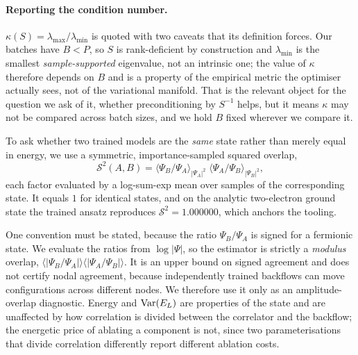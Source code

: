 \paragraph{Reporting the condition number.}
$\kappa(S)=\lambda_{\max}/\lambda_{\min}$ is quoted with two caveats that its definition
forces. Our batches have $B<P$, so $S$ is rank-deficient by construction and $\lambda_{\min}$
is the smallest \emph{sample-supported} eigenvalue, not an intrinsic one; the value of
$\kappa$ therefore depends on $B$ and is a property of the empirical metric the optimiser
actually sees, not of the variational manifold. That is the relevant object for the question we ask of it, whether preconditioning by $S^{-1}$ helps, but it means $\kappa$ may not be
compared across batch sizes, and we hold $B$ fixed wherever we compare it.

To ask whether two trained models are the \emph{same} state rather than merely equal in
energy, we use a symmetric, importance-sampled squared overlap,
\[
  \mathcal{S}^2(A,B)
  = \big\langle \Psi_B/\Psi_A\big\rangle_{|\Psi_A|^2}\;
    \big\langle \Psi_A/\Psi_B\big\rangle_{|\Psi_B|^2},
\]
each factor evaluated by a log-sum-exp mean over samples of the corresponding state.
It equals $1$ for identical states, and on the analytic two-electron ground state the
trained ansatz reproduces $\mathcal{S}^2=1.000000$, which anchors the tooling.

One convention must be stated, because the ratio $\Psi_B/\Psi_A$ is signed for a
fermionic state. We evaluate the ratios from $\log|\Psi|$, so the estimator is strictly a
\emph{modulus} overlap, $\langle|\Psi_B/\Psi_A|\rangle\langle|\Psi_A/\Psi_B|\rangle$. It is
an upper bound on signed agreement and does not certify nodal agreement, because independently
trained backflows can move configurations across different nodes. We therefore use it only as
an amplitude-overlap diagnostic. Energy and $\mathrm{Var}(E_L)$ are properties of the state and are unaffected
by how correlation is divided between the correlator and the backflow; the energetic price of
ablating a component is not, since two parameterisations that divide correlation differently
report different ablation costs.
